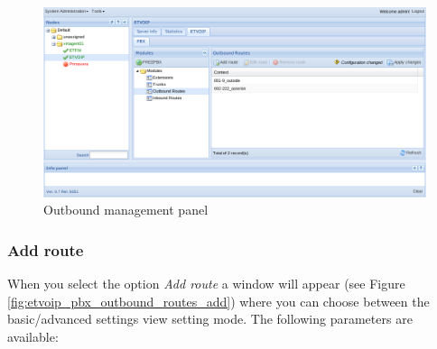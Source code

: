 \begin{figure}[H]
        \begin{center}
        \includegraphics[scale=0.45]{screenshots/etvoip_pbx_outbound_routes.png}
        \caption{Outbound management panel}
        \label{fig:etvoip_pbx_outbound_routes}
        \end{center}
\end{figure}

\subsubsection{Add route}
\label{sec:etvoip_pbx_outbound_routes_add}

When you select the option \emph{Add route} a window will appear (see Figure \ref{fig:etvoip_pbx_outbound_routes_add}) where you can choose between the basic/advanced settings view setting mode. The following parameters are available:

